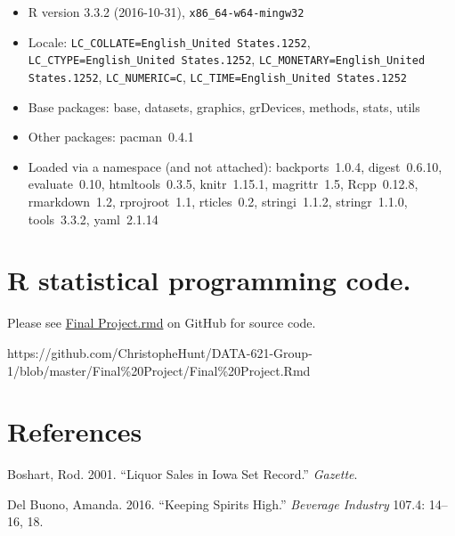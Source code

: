 \documentclass[]{elsarticle} %
\begin{document}
\begin{itemize}\raggedright
  \item R version 3.3.2 (2016-10-31), \verb|x86_64-w64-mingw32|
  \item Locale: \verb|LC_COLLATE=English_United States.1252|, \verb|LC_CTYPE=English_United States.1252|, \verb|LC_MONETARY=English_United States.1252|, \verb|LC_NUMERIC=C|, \verb|LC_TIME=English_United States.1252|
  \item Base packages: base, datasets, graphics, grDevices,
    methods, stats, utils
  \item Other packages: pacman~0.4.1
  \item Loaded via a namespace (and not attached):
    backports~1.0.4, digest~0.6.10, evaluate~0.10,
    htmltools~0.3.5, knitr~1.15.1, magrittr~1.5, Rcpp~0.12.8,
    rmarkdown~1.2, rprojroot~1.1, rticles~0.2, stringi~1.1.2,
    stringr~1.1.0, tools~3.3.2, yaml~2.1.14
\end{itemize}

\section{R statistical programming
code.}\label{r-statistical-programming-code.}

Please see
\href{https://github.com/ChristopheHunt/DATA-621-Group-1/blob/master/Final\%20Project/Final\%20Project.Rmd}{Final
Project.rmd} on GitHub for source code.

https://github.com/ChristopheHunt/DATA-621-Group-1/blob/master/Final\%20Project/Final\%20Project.Rmd

\section*{References}\label{references}

\hypertarget{refs}{}
\hypertarget{ref-IowaSetsRecord2}{}
Boshart, Rod. 2001. ``Liquor Sales in Iowa Set Record.'' \emph{Gazette}.

\hypertarget{ref-KeepingSpiritsHigh1}{}
Del Buono, Amanda. 2016. ``Keeping Spirits High.'' \emph{Beverage
Industry} 107.4: 14--16, 18.
\end{document}
